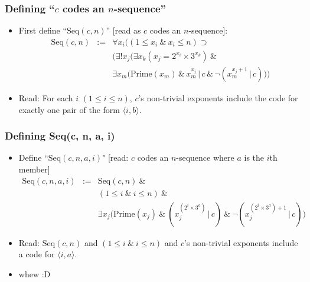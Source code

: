 \begin{frame}
\frametitle{Defining ``$c$ codes an $n$-sequence''}

\begin{itemize}[<+->]

\item First define ``$\text{Seq}(c,n)$'' [read as $c$ codes an $n$-sequence]:
\[
\begin{array}{ccl}
\text{Seq}(c,n)  & :=  &\forall x_i \Big((1 \leq x_i \ \& \ x_i \leq n) \supset\\
& & \big(\exists ! x_j (\exists x_k (x_j = 2^{x_i} \times 3^{x_k})\ \& \\
& & \exists x_m (\text{Prime}(x_m) \, \& \, x_m^{x_j} \, |\, c \,\&\, \neg(x_m^{x_j+1} \, |\, c)\big)\Big) 



\end{array}
\]

\item Read: For each \(i\) \((1 \leq i \leq n)\), $c$'s non-trivial exponents include the code for exactly one pair of the form \(\langle i,b\rangle\).


\end{itemize}
\end{frame}

\begin{frame}
\frametitle{Defining \textrm{Seq(c, n, a, i)}}

\begin{itemize}[<+->]

\item Define  ``\(\mbox{Seq}(c,n,a,i)\)" [read: $c$ codes an $n$-sequence where $a$ is the $i$th member]
\[
\begin{array}{ccl}
\text{Seq}(c,n,a,i)  & :=  &\mbox{Seq}(c,n) \ \& \\
& &  (1 \leq i \ \& \ i\leq n) \ \&\\
& &\exists x_j \big(\mbox{Prime}(x_j) \ \&\ (x_j^{(2^{i} \times 3^{a})} \, | \, c) \ \& \ \neg(x_j^{(2^{i} \times 3^{a})+1} \, | \, c)\big)
\end{array}
\]


\item Read: \(\mbox{Seq}(c,n)\) and \((1 \leq i \ \& \ i\leq n)\) and \(c\)'s non-trivial exponents include a code for \(\langle i, a\rangle\).

\item whew :D


\end{itemize}
\end{frame}

